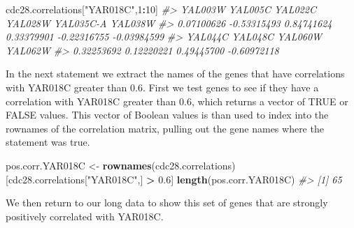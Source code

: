 \documentclass[]{book}
\newenvironment{Shaded}{\begin{snugshade}}{\end{snugshade}}
\newcommand{\CommentTok}[1]{\textcolor[rgb]{0.56,0.35,0.01}{\textit{#1}}}
\newcommand{\DataTypeTok}[1]{\textcolor[rgb]{0.13,0.29,0.53}{#1}}
\newcommand{\DecValTok}[1]{\textcolor[rgb]{0.00,0.00,0.81}{#1}}
\newcommand{\FloatTok}[1]{\textcolor[rgb]{0.00,0.00,0.81}{#1}}
\newcommand{\KeywordTok}[1]{\textcolor[rgb]{0.13,0.29,0.53}{\textbf{#1}}}
\newcommand{\NormalTok}[1]{#1}
\newcommand{\OperatorTok}[1]{\textcolor[rgb]{0.81,0.36,0.00}{\textbf{#1}}}
\newcommand{\StringTok}[1]{\textcolor[rgb]{0.31,0.60,0.02}{#1}}
\theoremstyle{definition}
\theoremstyle{definition}
\theoremstyle{definition}
\theoremstyle{remark}
\begin{document}
\begin{Shaded}
\begin{Highlighting}[]
\NormalTok{cdc28.correlations[}\StringTok{"YAR018C"}\NormalTok{,}\DecValTok{1}\OperatorTok{:}\DecValTok{10}\NormalTok{]  }
\CommentTok{#>     YAL003W     YAL005C     YAL022C     YAL028W   YAL035C-A     YAL038W }
\CommentTok{#>  0.07100626 -0.53315493  0.84741624  0.33379901 -0.22316755 -0.03984599 }
\CommentTok{#>     YAL044C     YAL048C     YAL060W     YAL062W }
\CommentTok{#>  0.32253692  0.12220221  0.49445700 -0.60972118}
\end{Highlighting}
\end{Shaded}

In the next statement we extract the names of the genes that have
correlations with YAR018C greater than 0.6. First we test genes to see
if they have a correlation with YAR018C greater than 0.6, which returns
a vector of TRUE or FALSE values. This vector of Boolean values is than
used to index into the rownames of the correlation matrix, pulling out
the gene names where the statement was true.

\begin{Shaded}
\begin{Highlighting}[]
\NormalTok{pos.corr.YAR018C <-}\StringTok{ }\KeywordTok{rownames}\NormalTok{(cdc28.correlations)[cdc28.correlations[}\StringTok{"YAR018C"}\NormalTok{,] }\OperatorTok{>}\StringTok{ }\FloatTok{0.6}\NormalTok{]}
\KeywordTok{length}\NormalTok{(pos.corr.YAR018C)}
\CommentTok{#> [1] 65}
\end{Highlighting}
\end{Shaded}

We then return to our long data to show this set of genes that are
strongly positively correlated with YAR018C.

\begin{Shaded}
\end{Shaded}
\end{document}
